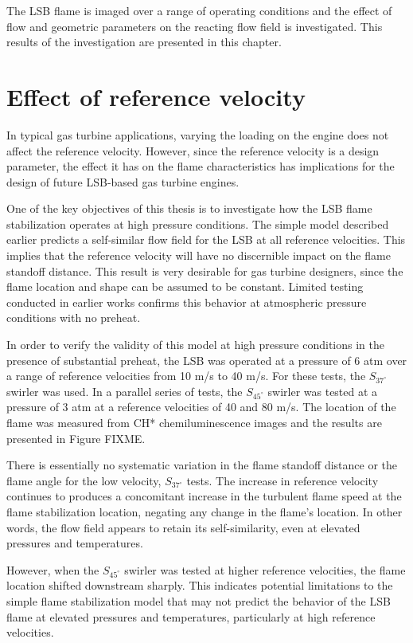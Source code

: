 The LSB flame is imaged over a range of operating conditions and the effect of flow and geometric parameters on the reacting flow field is investigated.
This results of the investigation are presented in this chapter.

\section{Effect of reference velocity}
\label{sec:refVelEffect}

In typical gas turbine applications, varying the loading on the engine does not affect the reference velocity.
However, since the reference velocity is a design parameter, the effect it has on the flame characteristics has implications for the design of future LSB-based gas turbine engines.

One of the key objectives of this thesis is to investigate how the LSB flame stabilization operates at high pressure conditions.
The simple model described earlier predicts a self-similar flow field for the LSB at all reference velocities.
This implies that the reference velocity will have no discernible impact on the flame standoff distance.
This result is very desirable for gas turbine designers, since the flame location and shape can be assumed to be constant.
Limited testing conducted in earlier works confirms this behavior at atmospheric pressure conditions with no preheat.

In order to verify the validity of this model at high pressure conditions in the presence of substantial preheat, the LSB was operated at a pressure of 6 atm over a range of reference velocities from 10 m/s to 40 m/s. For these tests, the \(S_{37^\circ}\) swirler was used.
In a parallel series of tests, the \(S_{45^\circ}\) swirler was tested at a pressure of 3 atm at a reference velocities of 40 and 80 m/s.
The location of the flame was measured from CH* chemiluminescence images and the results are presented in Figure FIXME.

There is essentially no systematic variation in the flame standoff distance or the flame angle for the low velocity, \(S_{37^\circ}\) tests.
The increase in reference velocity continues to produces a concomitant increase in the turbulent flame speed at the flame stabilization location, negating any change in the flame's location.
In other words, the flow field appears to retain its self-similarity, even at elevated pressures and temperatures.

However, when the \(S_{45^\circ}\) swirler was tested at higher reference velocities, the flame location shifted downstream sharply.
This indicates potential limitations to the simple flame stabilization model that may not predict the behavior of the LSB flame at elevated pressures and temperatures, particularly at high reference velocities.

